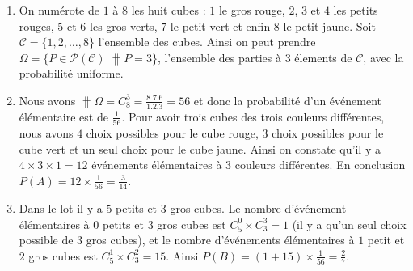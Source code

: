 \documentclass[a4paper,12pt,reqno]{amsart}
\begin{document}
\begin{solution}
  \begin{enumerate}
    \item On numérote de $1$ à $8$ les huit cubes : $1$ le gros rouge, $2$, $3$ et $4$ les petits rouges, $5$ et $6$ les gros verts, $7$ le petit vert et enfin $8$ le petit jaune. Soit $\mathcal{C}=\{1,2,\ldots,8\}$ l'ensemble des cubes. Ainsi on peut prendre $\Omega = \{P \in \mathcal{P}(\mathcal{C}) | \hash P = 3\}$, l'ensemble des parties à 3 élements de $\mathcal{C}$, avec la probabilité uniforme.
    \item Nous avons $\hash \Omega = C^{3}_{8}=\frac{8.7.6}{1.2.3} = 56$ et donc la probabilité d'un événement élémentaire est de $\frac{1}{56}$. Pour avoir trois cubes des trois couleurs différentes, nous avons $4$ choix possibles pour le cube rouge, $3$ choix possibles pour le cube vert et un seul choix pour le cube jaune. Ainsi on constate qu'il y a $4 \times 3 \times 1 = 12$ événements élémentaires à $3$ couleurs différentes. En conclusion $P(A)=12 \times \frac{1}{56}=\frac{3}{14}$.
    \item Dans le lot il y a $5$ petits et $3$ gros cubes. Le nombre d'événement élémentaires à $0$ petits et $3$ gros cubes est $C^{0}_{5} \times C^{3}_{3}=1$ (il y a qu'un seul choix possible de 3 gros cubes), et le nombre d'événements élémentaires à $1$ petit et $2$ gros cubes est $C^{1}_{5} \times C^{2}_{3} = 15$. Ainsi $P(B) = (1+15) \times \frac{1}{56} = \frac{2}{7}$.
  \end{enumerate}

\end{solution}
\end{document}
